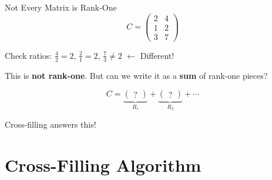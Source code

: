 \documentclass[10pt]{beamer}
\theoremstyle{definition}
\newcommand{\x}[1]{\alert{\textbf{#1}}}
\begin{document}
\begin{frame}{Not Every Matrix is Rank-One}
$$C = \begin{pmatrix}
2 & 4 \\
1 & 2 \\
3 & 7
\end{pmatrix}$$

\vfill
Check ratios: $\frac{4}{2} = 2$, \quad $\frac{2}{1} = 2$, \quad $\frac{7}{3} \neq 2$ \quad $\leftarrow$ Different!

\vfill
This is \x{not rank-one}. But can we write it as a \x{sum} of rank-one pieces?

$$C = \underbrace{\begin{pmatrix} ? \end{pmatrix}}_{R_1} + \underbrace{\begin{pmatrix} ? \end{pmatrix}}_{R_2} + \cdots$$

Cross-filling answers this!
\end{frame}

\section{Cross-Filling Algorithm}
\end{document}
